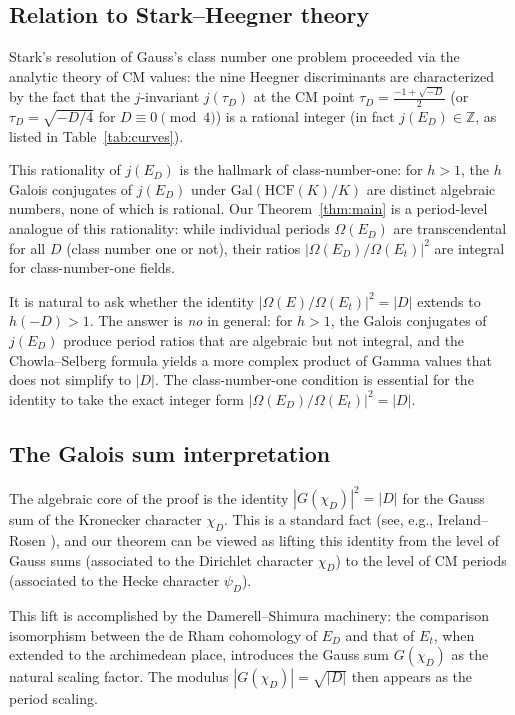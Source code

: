 \documentclass[12pt,a4paper]{article}
\theoremstyle{plain}
\theoremstyle{definition}
\newcommand{\Z}{\mathbb{Z}}
\newcommand{\Gal}{\mathrm{Gal}}
\begin{document}
\subsection{Relation to Stark--Heegner theory}

Stark's resolution of Gauss's class number one problem \cite{Stark1967}
proceeded via the analytic theory of CM values: the nine Heegner discriminants
are characterized by the fact that the $j$-invariant $j(\tau_D)$ at the CM
point $\tau_D = \frac{-1 + \sqrt{-D}}{2}$ (or $\tau_D = \sqrt{-D/4}$ for
$D \equiv 0 \pmod 4$) is a rational integer (in fact $j(E_D) \in \Z$, as
listed in Table~\ref{tab:curves}).

This rationality of $j(E_D)$ is the hallmark of class-number-one: for $h > 1$,
the $h$ Galois conjugates of $j(E_D)$ under $\Gal(\mathrm{HCF}(K)/K)$ are
distinct algebraic numbers, none of which is rational.  Our Theorem~\ref{thm:main}
is a period-level analogue of this rationality: while individual periods
$\Omega(E_D)$ are transcendental for all $D$ (class number one or not),
their ratios $|\Omega(E_D)/\Omega(E_t)|^2$ are integral for class-number-one
fields.

It is natural to ask whether the identity $|\Omega(E)/\Omega(E_t)|^2 = |D|$
extends to $h(-D) > 1$.  The answer is \emph{no} in general: for $h > 1$,
the Galois conjugates of $j(E_D)$ produce period ratios that are algebraic
but not integral, and the Chowla--Selberg formula yields a more complex
product of Gamma values that does not simplify to $|D|$.  The class-number-one
condition is essential for the identity to take the exact integer form
$|\Omega(E_D)/\Omega(E_t)|^2 = |D|$.

\subsection{The Galois sum interpretation}

The algebraic core of the proof is the identity $|G(\chi_D)|^2 = |D|$ for
the Gauss sum of the Kronecker character $\chi_D$.  This is a standard fact
(see, e.g., Ireland--Rosen \cite{IrelandRosen1990}), and our theorem can be viewed as lifting this identity from the
level of Gauss sums (associated to the Dirichlet character $\chi_D$) to the
level of CM periods (associated to the Hecke character $\psi_D$).

This lift is accomplished by the Damerell--Shimura machinery: the comparison
isomorphism between the de Rham cohomology of $E_D$ and that of $E_t$, when
extended to the archimedean place, introduces the Gauss sum $G(\chi_D)$ as
the natural scaling factor.  The modulus $|G(\chi_D)| = \sqrt{|D|}$ then
appears as the period scaling.
\end{document}
